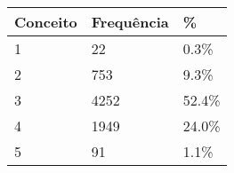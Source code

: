 \begin{table}[H]
\centering
\begin{tabular}{@{}lll@{}}
\toprule
\textbf{Conceito} & \textbf{Frequência} & \textbf{\%} \\ \midrule
1                 & 22                  & 0.3\%               \\
2                 & 753                 & 9.3\%               \\
3                 & 4252                & 52.4\%              \\
4                 & 1949                & 24.0\%              \\
5                 & 91                  & 1.1\%               \\ \bottomrule
\end{tabular}
\end{table}